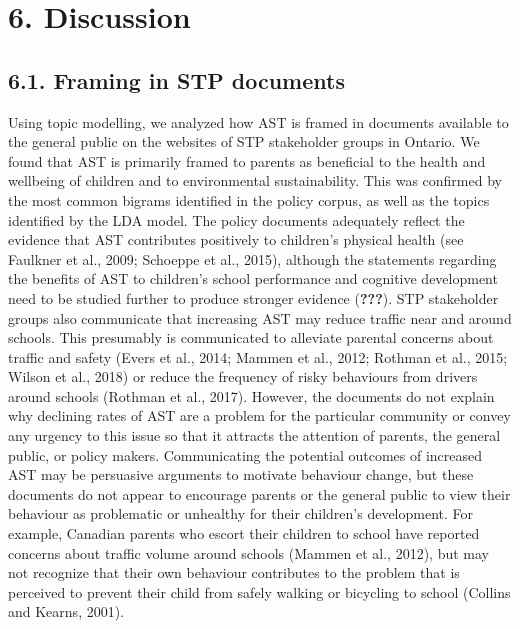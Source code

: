 \documentclass[]{elsarticle} %
\begin{document}
\hypertarget{discussion}{%
\section{6. Discussion}\label{discussion}}

\hypertarget{framing-in-stp-documents}{%
\subsection{6.1. Framing in STP
documents}\label{framing-in-stp-documents}}

Using topic modelling, we analyzed how AST is framed in documents
available to the general public on the websites of STP stakeholder
groups in Ontario. We found that AST is primarily framed to parents as
beneficial to the health and wellbeing of children and to environmental
sustainability. This was confirmed by the most common bigrams identified
in the policy corpus, as well as the topics identified by the LDA model.
The policy documents adequately reflect the evidence that AST
contributes positively to children's physical health (see Faulkner et
al., 2009; Schoeppe et al., 2015), although the statements regarding the
benefits of AST to children's school performance and cognitive
development need to be studied further to produce stronger evidence
({\textbf{???}}). STP stakeholder groups also communicate that
increasing AST may reduce traffic near and around schools. This
presumably is communicated to alleviate parental concerns about traffic
and safety (Evers et al., 2014; Mammen et al., 2012; Rothman et al.,
2015; Wilson et al., 2018) or reduce the frequency of risky behaviours
from drivers around schools (Rothman et al., 2017). However, the
documents do not explain why declining rates of AST are a problem for
the particular community or convey any urgency to this issue so that it
attracts the attention of parents, the general public, or policy makers.
Communicating the potential outcomes of increased AST may be persuasive
arguments to motivate behaviour change, but these documents do not
appear to encourage parents or the general public to view their
behaviour as problematic or unhealthy for their children's development.
For example, Canadian parents who escort their children to school have
reported concerns about traffic volume around schools (Mammen et al.,
2012), but may not recognize that their own behaviour contributes to the
problem that is perceived to prevent their child from safely walking or
bicycling to school (Collins and Kearns, 2001).
\end{document}
